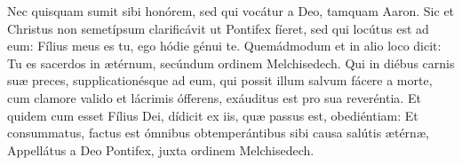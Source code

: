 
Nec quisquam sumit sibi honórem, sed qui vocátur a Deo, tamquam Aaron.
Sic et Christus non semetípsum clarificávit ut Pontifex fíeret, sed qui locútus est ad eum: Fílius meus es tu, ego hódie génui te.
Quemádmodum et in alio loco dicit: Tu es sacerdos in ætérnum, secúndum ordinem Melchisedech.
Qui in diébus carnis suæ preces, supplicationésque ad eum, qui possit illum salvum fácere a morte, cum clamore valido et lácrimis ófferens, exáuditus est pro sua reveréntia.
Et quidem cum esset Fílius Dei, dídicit ex iis, quæ passus est, obediéntiam:
Et consummatus, factus est ómnibus obtemperántibus sibi causa salútis ætérnæ,
Appellátus a Deo Pontifex, juxta ordinem Melchisedech.
\par